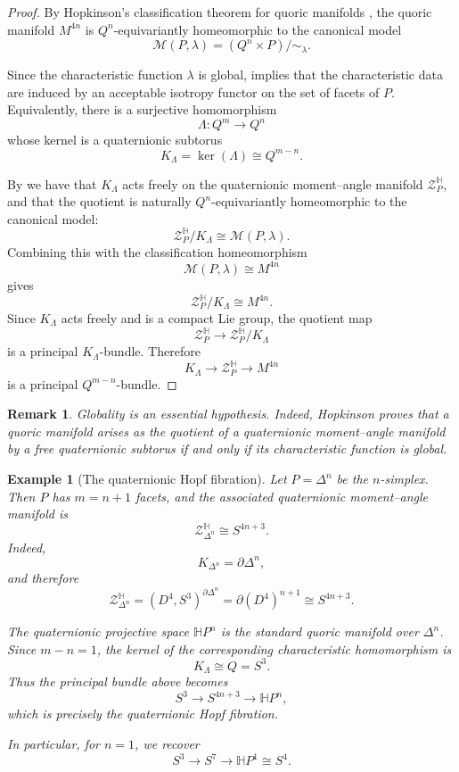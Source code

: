 \documentclass[11pt,a4paper]{article}
\numberwithin{equation}{section}
\newtheorem{remark}[definition]{Remark}
\newtheorem{example}[definition]{Example}
\theoremstyle{named}
\begin{document}
\begin{proof}
By Hopkinson's classification theorem for quoric manifolds \cite[Proposition~4.2.10]{ho}, the quoric manifold \(M^{4n}\) is \(Q^n\)-equivariantly homeomorphic to the canonical model
\[
    \mathcal M(P,\lambda)
    =
    (Q^n\times P)/{\sim_\lambda}.
\]

Since the characteristic function \(\lambda\) is global, \cite[Corollary~5.1.4]{ho} implies that the characteristic data are induced by an acceptable isotropy functor on the set of facets of \(P\). Equivalently, there is a surjective homomorphism
\[
    \Lambda:Q^m\longrightarrow Q^n
\]
whose kernel is a quaternionic subtorus
\[
    K_\Lambda=\ker(\Lambda)\cong Q^{m-n}.
\]

By \cite[Propositions~5.2.4 and~5.2.6]{ho} we have that \(K_\Lambda\) acts freely on the quaternionic moment--angle manifold \(\mathcal Z_P^{\mathbb H}\), and that the quotient is naturally \(Q^n\)-equivariantly homeomorphic to the canonical model:
\[
    \mathcal Z_P^{\mathbb H}/K_\Lambda
    \cong
    \mathcal M(P,\lambda).
\]
Combining this with the classification homeomorphism
\[
    \mathcal M(P,\lambda)\cong M^{4n}
\]
gives
\[
    \mathcal Z_P^{\mathbb H}/K_\Lambda
    \cong
    M^{4n}.
\]
Since \(K_\Lambda\) acts freely and is a compact Lie group, the quotient map
\[
    \mathcal Z_P^{\mathbb H}
    \longrightarrow
    \mathcal Z_P^{\mathbb H}/K_\Lambda
\]
is a principal \(K_\Lambda\)-bundle.  Therefore
\[
    K_\Lambda
    \longrightarrow
    \mathcal Z_P^{\mathbb H}
    \longrightarrow
    M^{4n}
\]
is a principal \(Q^{m-n}\)-bundle.
\end{proof}

\begin{remark}
Globality is an essential hypothesis. Indeed, Hopkinson proves \cite[Proposition~5.2.7]{ho} that a quoric manifold arises as the quotient of a quaternionic moment--angle manifold by a free quaternionic subtorus if and only if its characteristic function is global.
\end{remark}


\begin{example}[The quaternionic Hopf fibration]
Let \(P=\Delta^n\) be the \(n\)-simplex.  Then \(P\) has \(m=n+1\) facets, and the associated quaternionic moment--angle manifold is
\[
    \mathcal Z_{\Delta^n}^{\mathbb H}
    \cong
    S^{4n+3}.
\]
Indeed,
\[
    K_{\Delta^n}=\partial\Delta^n,
\]
and therefore
\[
    \mathcal Z_{\Delta^n}^{\mathbb H}
    =
    (D^4,S^3)^{\partial\Delta^n}
    =
    \partial(D^4)^{n+1}
    \cong
    S^{4n+3}.
\]

The quaternionic projective space \(\mathbb H P^n\) is the standard quoric manifold over \(\Delta^n\). Since \(m-n=1\), the kernel of the corresponding characteristic homomorphism is
\[
    K_\Lambda\cong Q=S^3.
\]
Thus the principal bundle above becomes
\[
    S^3
    \longrightarrow
    S^{4n+3}
    \longrightarrow
    \mathbb H P^n,
\]
which is precisely the \emph{quaternionic Hopf fibration}.

In particular, for \(n=1\), we recover
\[
    S^3
    \longrightarrow
    S^7
    \longrightarrow
    \mathbb H P^1\cong S^4.
\]
\end{example}
\end{document}
